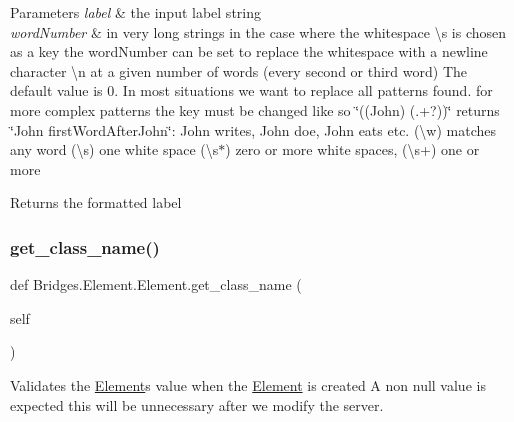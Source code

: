 \begin{DoxyParams}{Parameters}
{\em label} & the input label string\\
\hline
{\em word\+Number} & in very long strings in the case where the whitespace \textbackslash{}s is chosen as a key the word\+Number can be set to replace the whitespace with a newline character \textbackslash{}n at a given number of words (every second or third word) The default value is 0. In most situations we want to replace all patterns found. for more complex patterns the key must be changed like so \char`\"{}((\+John) (.+?))\char`\"{} returns \char`\"{}\+John first\+Word\+After\+John\char`\"{}\+: John writes, John doe, John eats etc. (\textbackslash{}w) matches any word (\textbackslash{}s) one white space (\textbackslash{}s$\ast$) zero or more white spaces, (\textbackslash{}s+) one or more\\
\hline
\end{DoxyParams}
\begin{DoxyReturn}{Returns}
the formatted label 
\end{DoxyReturn}
\mbox{\label{class_bridges_1_1_element_1_1_element_a8ac6ce7fef24e2f2dae3b7f56f079e4e}} 
\subsubsection{\texorpdfstring{get\+\_\+class\+\_\+name()}{get\_class\_name()}}
{\footnotesize\ttfamily def Bridges.\+Element.\+Element.\+get\+\_\+class\+\_\+name (\begin{DoxyParamCaption}\item[{}]{self }\end{DoxyParamCaption})}



Validates the \mbox{\hyperlink{class_bridges_1_1_element_1_1_element}{Element}}\textquotesingle{}s value when the \mbox{\hyperlink{class_bridges_1_1_element_1_1_element}{Element}} is created A non null value is expected this will be unnecessary after we modify the server. 


